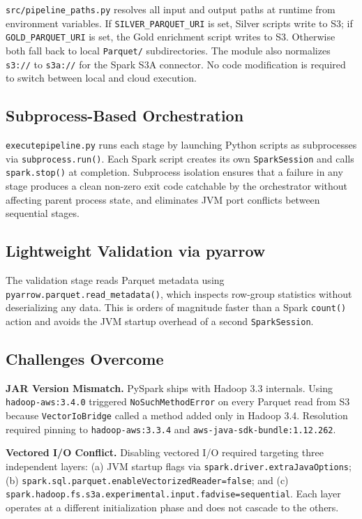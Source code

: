 \documentclass[conference]{IEEEtran}
\begin{document}
\texttt{src/pipeline\_paths.py} resolves all input and output paths at runtime from environment variables. If \texttt{SILVER\_PARQUET\_URI} is set, Silver scripts write to S3; if \texttt{GOLD\_PARQUET\_URI} is set, the Gold enrichment script writes to S3. Otherwise both fall back to local \texttt{Parquet/} subdirectories. The module also normalizes \texttt{s3://} to \texttt{s3a://} for the Spark S3A connector. No code modification is required to switch between local and cloud execution.

\subsection{Subprocess-Based Orchestration}

\texttt{executepipeline.py} runs each stage by launching Python scripts as subprocesses via \texttt{subprocess.run()}. Each Spark script creates its own \texttt{SparkSession} and calls \texttt{spark.stop()} at completion. Subprocess isolation ensures that a failure in any stage produces a clean non-zero exit code catchable by the orchestrator without affecting parent process state, and eliminates JVM port conflicts between sequential stages.

\subsection{Lightweight Validation via pyarrow}

The validation stage reads Parquet metadata using \texttt{pyarrow.parquet.read\_metadata()}, which inspects row-group statistics without deserializing any data. This is orders of magnitude faster than a Spark \texttt{count()} action and avoids the JVM startup overhead of a second \texttt{SparkSession}.

\subsection{Challenges Overcome}

\textbf{JAR Version Mismatch.} PySpark ships with Hadoop 3.3 internals. Using \texttt{hadoop-aws:3.4.0} triggered \texttt{NoSuchMethodError} on every Parquet read from S3 because \texttt{VectorIoBridge} called a method added only in Hadoop 3.4. Resolution required pinning to \texttt{hadoop-aws:3.3.4} and \texttt{aws-java-sdk-bundle:1.12.262}.

\textbf{Vectored I/O Conflict.} Disabling vectored I/O required targeting three independent layers: (a) JVM startup flags via \texttt{spark.driver.extraJavaOptions}; (b) \texttt{spark.sql.parquet.enableVectorizedReader=false}; and (c) \texttt{spark.hadoop.fs.s3a.experimental.input.fadvise=sequential}. Each layer operates at a different initialization phase and does not cascade to the others.
\end{document}

